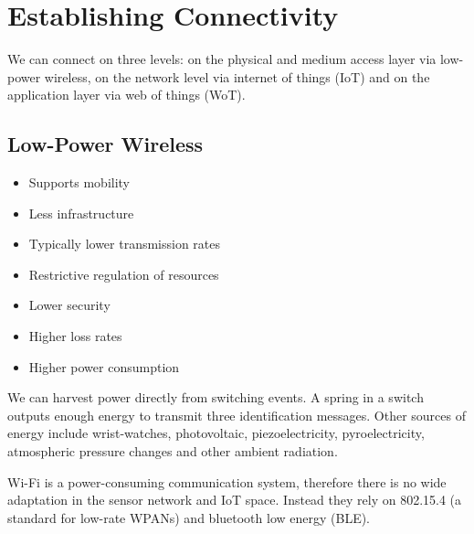\section{Establishing Connectivity}
\begin{mytitle} We can connect on three levels: on the physical and medium access layer via low-power wireless, on the network level via internet of things (IoT) and on the application layer via web of things (WoT).
\end{mytitle}

\subsection{Low-Power Wireless}
\begin{mytitle}
    \begin{mysubtitle}\hfill
    \begin{itemize}
        \item Supports mobility
        \item Less infrastructure
    \end{itemize}
    \end{mysubtitle}
    \begin{mysubtitle}\hfill
    \begin{itemize}
        \item Typically lower transmission rates
        \item Restrictive regulation of resources
        \item Lower security
        \item Higher loss rates
        \item Higher power consumption
    \end{itemize}
    \end{mysubtitle}
\end{mytitle}
\begin{mytitle} We can harvest power directly from switching events. A spring in a switch outputs enough energy to transmit three identification messages. Other sources of energy include wrist-watches, photovoltaic, piezoelectricity, pyroelectricity, atmospheric pressure changes and other ambient radiation.
\end{mytitle}
\begin{mytitle}[Wi-Fi (802.11)] Wi-Fi is a power-consuming communication system, therefore there is no wide adaptation in the sensor network and IoT space. Instead they rely on 802.15.4 (a standard for low-rate WPANs) and bluetooth low energy (BLE).
\end{mytitle}
